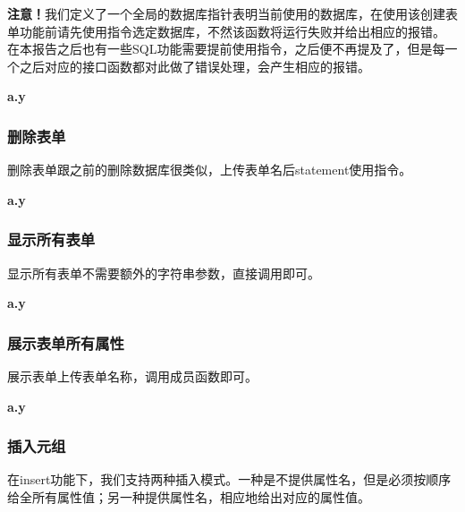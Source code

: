 \documentclass{article}
\begin{document}
\begin{spacing}{2}
            \textbf{注意！}我们定义了一个全局的数据库指针表明当前使用的数据库，在使用该创建表单功能前请先使用指令选定数据库，不然该函数将运行失败并给出相应的报错。
            在本报告之后也有一些SQL功能需要提前使用指令，之后便不再提及了，但是每一个之后对应的接口函数都对此做了错误处理，会产生相应的报错。

            \textbf{a.y}
            \begin{spacing}{1.15}
            
            \end{spacing}
        \subsubsection{删除表单}
            删除表单跟之前的删除数据库很类似，上传表单名后statement使用指令。

            \textbf{a.y}
            \begin{spacing}{1.15}
            
            \end{spacing}


        \subsubsection{显示所有表单}
            显示所有表单不需要额外的字符串参数，直接调用即可。

            \textbf{a.y}
            \begin{spacing}{1.15}
            
            \end{spacing}
        \subsubsection{展示表单所有属性}
            展示表单上传表单名称，调用成员函数即可。

            \textbf{a.y}
            \begin{spacing}{1.15}
            
            \end{spacing}
        \subsubsection{插入元组}
            在insert功能下，我们支持两种插入模式。一种是不提供属性名，但是必须按顺序给全所有属性值；另一种提供属性名，相应地给出对应的属性值。


\end{spacing}
\end{document}

